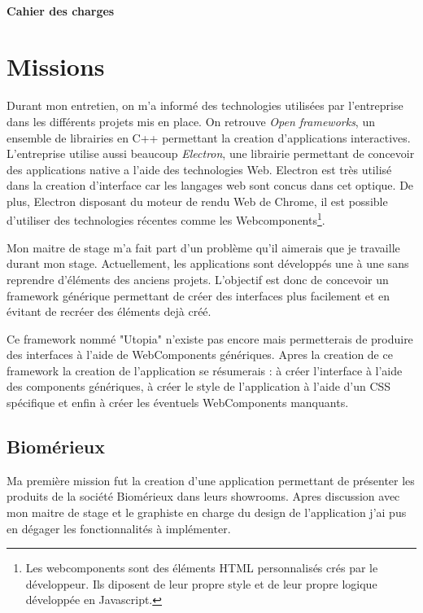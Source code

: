 \documentclass{article}
\begin{document}
\paragraph{Cahier des charges} %

\section{Missions}

Durant mon entretien, on m'a informé des technologies utilisées par l'entreprise dans les différents projets mis en place.
On retrouve \emph{Open frameworks}, un ensemble de librairies en C++ permettant la creation d'applications interactives.
L'entreprise utilise aussi beaucoup \emph{Electron}, une librairie permettant de concevoir des applications native a l'aide des technologies Web.
Electron est très utilisé dans la creation d'interface car les langages web sont concus dans cet optique.
De plus, Electron disposant du moteur de rendu Web de Chrome, il est possible d'utiliser des technologies récentes comme les Webcomponents\footnote{Les webcomponents sont des éléments HTML personnalisés crés par le développeur. Ils diposent de leur propre style et de leur propre logique développée en Javascript.}.

Mon maitre de stage m'a fait part d'un problème qu'il aimerais que je travaille durant mon stage.
Actuellement, les applications sont développés une à une sans reprendre d'éléments des anciens projets.
L'objectif est donc de concevoir un framework générique permettant de créer des interfaces plus facilement et en évitant de recréer des éléments dejà créé.

Ce framework nommé "Utopia" n'existe pas encore mais permetterais de produire des interfaces à l'aide de WebComponents génériques.
Apres la creation de ce framework la creation de l'application se résumerais : à créer l'interface à l'aide des components génériques, à créer le style de l'application à l'aide d'un CSS spécifique et enfin à créer les éventuels WebComponents manquants.

\subsection{Biomérieux}

Ma première mission fut la creation d'une application permettant de présenter les produits de la société Biomérieux dans leurs showrooms.
Apres discussion avec mon maitre de stage et le graphiste en charge du design de l'application j'ai pus en dégager les fonctionnalités à implémenter.
\end{document}

